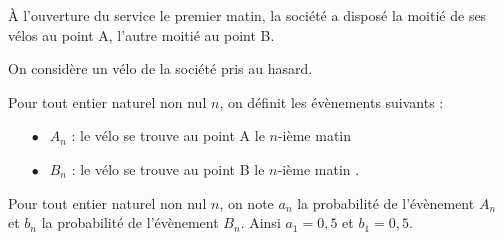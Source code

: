 \documentclass[10pt]{article}
\begin{document}
À l'ouverture du service le premier matin, la société a disposé la moitié de ses vélos au point A, l'autre moitié au point B.

\smallskip

On considère un vélo de la société pris au hasard.

\smallskip

Pour tout entier naturel non nul $n$, on définit les évènements suivants :

\setlength\parindent{1cm}
\begin{itemize}
\item[$\bullet~~$]$A_n$ : \og le vélo se trouve au point A le $n$-ième matin \fg{}
\item[$\bullet~~$]$B_n$ : \og le vélo se trouve au point B le $n$-ième matin \fg.
\end{itemize}
\setlength\parindent{0cm}

Pour tout entier naturel non nul $n$, on note $a_n$ la probabilité de l'évènement $A_n$ et $b_n$ la probabilité de l'évènement $B_n$. Ainsi $a_1 = 0,5$ et $b_1 =  0,5$.

\medskip
\end{document}
